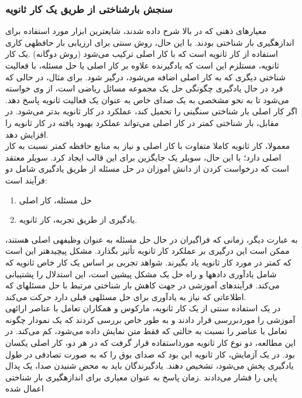 \subsubsection{سنجش بارشناختی از طریق یک کار ثانویه}
معيارهای ذهنی كه  در  بالا  شرح  داده  شدند،  شایعترین ابزار  مورد استفاده  برای اندازهگيری بار 
شناختی بودند. با این حال، روش سنتی برای ارزیابی بار حافظهی كاری استفاده از كار ثانویه است كه با 
كار اصلی
تركيب می‌شود (روش دوگانه) .یک كار ثانویه، مستلزم این است كه یادگيرنده علاوه بر كار 
اصلی یا حل مسئله، با فعاليت شناختی دیگری كه به كار اصلی اضافه می‌شود، درگير شود. برای مثال، در
حالی كه فرد در حال یادگيری چگونگی حل یک مجموعه مسائل ریاضی است، از وی خواسته می‌شود تا به 
نحو مشخصی به یک صدای خاص به عنوان یک فعاليت ثانویه پاسخ دهد. اگر كار اصلی بار شناختی
سنگينی را تحميل كند، عملکرد در كار ثانویه بدتر می‌شود. در مقابل، بار شناختی كمتر در كار اصلی
می‌تواند عملکرد بهبود یافته در كار ثانویه را افزایش دهد.
\cite{sweller1988cognitive}
\\
معمولا، كار ثانویه كاملا متفاوت با كار اصلی و نياز به منابع حافظه كمتر نسبت به كار اصلی دارد؛ با این
حال،  سویلر یک جایگزین برای این قالب ایجاد كرد.  سویلر معتقد  است  كه  درخواست  كردن  از  دانش
آموزان در حل مسئله از طریق یادگيری شامل دو فرآیند است:
\begin{enumerate}
	\item حل مسئله، كار اصلی
	\item یادگيری از 
	طریق تجربه، كار ثانویه.
\end{enumerate}
به عبارت دیگر، زمانی كه فراگيران در حال حل مسئله به عنوان وظيفهی اصلی
هستند، ممکن است این درگيری بر عملکرد كار ثانویه تأثير بگذارد. مشکل پيچيدهتر این است كه كمتر در 
مورد كار ثانویه یاد بگيرند. شواهد تجربی بر اساس یک كار خاص ثانویه كه شامل یادآوری دادهها و راه حل 
یک مشکل  پيشين است،  این استدلال  را  پشتيبانی  می‌كند.  فرآیندهای آموزشی در  جهت  كاهش  بار شناختی مرتبط با حل مسئلهای كه اطلاعاتی كه نياز به یادآوری برای حل مسئلهی قبلی دارد حركت 
می‌كند.
\cite{sweller1988cognitive}
\\
در یک استفاده  سنتی از  یک كار  ثانویه، ماركوس  و  همکاران  تعامل  با  عناصر  ارائهی آموزشی را 
موردبررسی قرار دادند و به طور خاص بررسی كردند كه یک نمودار چگونه تعامل با عناصر را  نسبت به 
حالتی كه فقط متن نمایش داده می‌شود، كم می‌كند. در این مطالعه، دو نوع كار ثانویه مورداستفاده قرار 
گرفت كه در هر دو، كار اصلی یکسان بود. در یک آزمایش، كار ثانویه این بود كه صدای بوق را كه به صورت 
تصادفی در طول یادگيری پخش می‌شود، تشخيص دهند. یادگيرندگان باید به محض شنيدن صدا، یک
پدال پایی را  فشار می‌دادند .زمان پاسخ
به عنوان معياری برای اندازهگيری بار شناختی اعمال شده 
